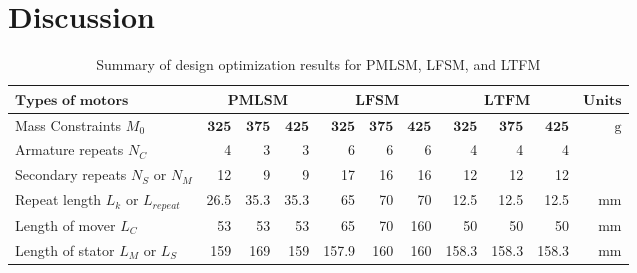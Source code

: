     \section{Discussion}                            \label{Chapter:RSM/discussion}
        \begin{landscape}
            \begin{table}[]
                \renewcommand{\arraystretch}{1.2}
                \caption{Summary of design optimization results for PMLSM, LFSM, and LTFM}
                \begin{tabular}{l|rrr|rrr|rrr|r}
                \hline
                \multicolumn{1}{l|}{$\textbf{Types of motors}$}                         & \multicolumn{3}{c|}{$\textbf{PMLSM}$}            & \multicolumn{3}{c|}{$\textbf{LFSM}$}             & \multicolumn{3}{c|}{$\textbf{LTFM}$}             &  {$\textbf{Units}$}              \\ 
                \hline
                Mass Constraints $M_0$                                       & $\textbf{325}$ & $\textbf{375}$ & $\textbf{425}$ & $\textbf{325}$ & $\textbf{375}$ & $\textbf{425}$ & $\textbf{325}$ & $\textbf{375}$ & $\textbf{425}$ & $\mathrm{g}$   \\
                Armature repeats $N_C$                                       & 4              & 3              & 3              & 6              & 6              & 6              & 4              & 4              & 4              &                \\
                Secondary repeats $N_S$ or $N_M$                             & 12             & 9              & 9              & 17             & 16             & 16             & 12             & 12             & 12             &                \\
                Repeat length $L_k$ or $L_{repeat}$                          & 26.5           & 35.3           & 35.3           & 65             & 70             & 70             & 12.5           & 12.5           & 12.5           & \multicolumn{1}{r}{$\mathrm{mm}$} \\
                Length of mover $L_C$                                        & 53             & 53             & 53             & 65             & 70             & 160            & 50             & 50             & 50             & \multicolumn{1}{r}{$\mathrm{mm}$} \\
                Length of stator $L_M$ or $L_S$                              & 159            & 169            & 159            & 157.9          & 160            & 160            & 158.3          & 158.3          & 158.3          & \multicolumn{1}{r}{$\mathrm{mm}$} \\

\end{tabular}
\end{table}
\end{landscape}
